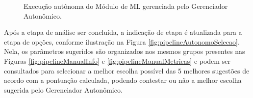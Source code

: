 \documentclass[Portugues,Final]{ic-tese-v3}
\begin{document}
\begin{figure}[H]
    \centering
    \caption{Execução autônoma do Módulo de ML gerenciada pelo Gerenciador Autonômico.}
    \label{fig:pipelineAutonomo}
\end{figure}

Após a etapa de análise ser concluída, a indicação de etapa é atualizada para a etapa de opções, conforme ilustração na Figura \ref{fig:pipelineAutonomoSelecao}. Nela, os parâmetros sugeridos são organizados nos mesmos grupos presentes nas Figuras \ref{fig:pipelineManualInfo} e \ref{fig:pipelineManualMetricas} e podem ser consultados para selecionar a melhor escolha possível das 5 melhores sugestões de acordo com a pontuação calculada, podendo contestar ou não a melhor escolha sugerida pelo Gerenciador Autonômico.
\end{document}
